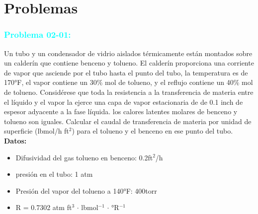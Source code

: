 \documentclass{report}
\begin{document}
\section{Problemas}
\subsubsection{\textbf{\textcolor{cyan}{Problema 02-01:}}} 
\begin{raggedright}
	Un tubo y un condensador de vidrio aislados térmicamente están montados sobre un calderín que contiene benceno y tolueno. El calderín
	proporciona una corriente de vapor que asciende por el tubo hasta el punto del tubo, la temperatura es de 170°F, el vapor contiene un 30$\%$
	mol de tolueno, y el reflujo contiene un 40$\%$ mol de tolueno. Considérese que toda la resistencia a la transferencia de materia entre el líquido
	y el vapor la ejerce una capa de vapor estacionaria de de 0.1 inch de espesor adyacente a la fase líquida. los calores latentes molares de benceno y tolueno
	son iguales. Calcular el caudal de transferencia de materia por unidad de superficie (lbmol/h ft$^2$) para el tolueno y el benceno en ese punto del tubo.\\

	\textbf{Datos:}
	\begin{itemize}
		\item [] Difusividad del gas tolueno en benceno: 0.2ft$^2$/h
		\item [] presión en el tubo: 1 atm
		\item [] Presión del vapor del tolueno a 140°F: 400torr
		\item [] R = 0.7302 atm ft$^3$ $\cdot$ lbmol$^{-1}$ $\cdot$ °R$^{-1}$
	\end{itemize}
\end{raggedright}
\end{document}

